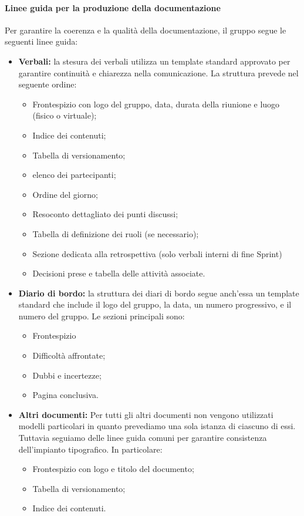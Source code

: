 \documentclass[a4paper,12pt]{article}
\begin{document}
\paragraph{Linee guida per la produzione della documentazione}\label{lineeGuidaProduzioneDocs}
Per garantire la coerenza e la qualità della documentazione, il gruppo segue le seguenti linee guida:
\begin{itemize}
    \item \textbf{Verbali:} la stesura dei verbali utilizza un template standard approvato per garantire continuità e chiarezza nella comunicazione. La struttura prevede nel seguente ordine:
    \begin{itemize}
        \item Frontespizio con logo del gruppo, data, durata della riunione e luogo (fisico o virtuale);    
        \item Indice dei contenuti;
        \item Tabella di versionamento;
        \item elenco dei partecipanti;
        \item Ordine del giorno;
        \item Resoconto dettagliato dei punti discussi;
        \item Tabella di definizione dei ruoli (se necessario);
        \item Sezione dedicata alla retrospettiva (solo verbali interni di fine Sprint)
        \item Decisioni prese e tabella delle attività associate.
    \end{itemize}
    \item \textbf{Diario di bordo:} la struttura dei diari di bordo segue anch'essa un template standard che include il logo del gruppo, la data, un numero progressivo, e il numero del gruppo. Le sezioni principali sono:
    \begin{itemize}
        \item Frontespizio
        \item Difficoltà affrontate;
        \item Dubbi e incertezze;
        \item Pagina conclusiva. 
    \end{itemize}
    \item \textbf{Altri documenti:} Per tutti gli altri documenti non vengono utilizzati modelli particolari in quanto prevediamo una sola istanza di ciascuno di essi. Tuttavia seguiamo delle linee guida comuni per garantire consistenza dell'impianto tipografico. In particolare:
    \begin{itemize}
        \item Frontespizio con logo e titolo del documento;
        \item Tabella di versionamento;
        \item Indice dei contenuti. 
    \end{itemize}
\end{itemize}
\end{document}
